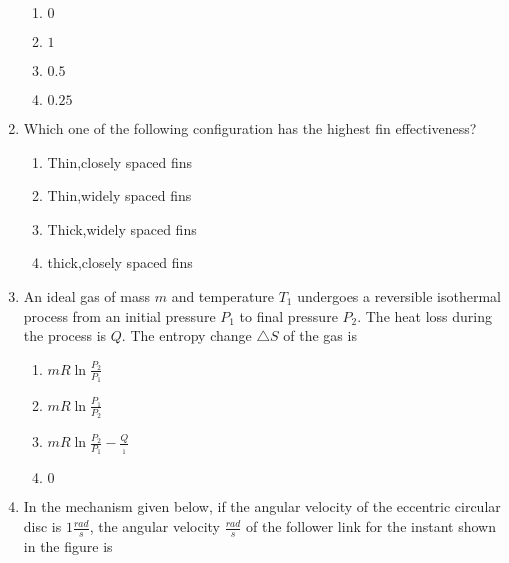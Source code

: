 \documentclass[journal]{IEEEtran}
\begin{document}
\begin{enumerate}

    \begin{enumerate}
        \item $0$
        \item $1$
        \item $0.5$
        \item $0.25$
    \end{enumerate}
    \item Which one of the following configuration has the highest fin effectiveness?
    \begin{enumerate}
        \item Thin,closely spaced fins
        \item Thin,widely spaced fins
        \item Thick,widely spaced fins
        \item thick,closely spaced fins
    \end{enumerate}
    \item An ideal gas of mass $m$ and temperature $T_1$ undergoes a reversible isothermal process from an initial pressure $P_1$ to final pressure $P_2$. The heat loss during the process is $Q$. The entropy change $\triangle S$ of the gas is
    \begin{enumerate}
        \item $mR\ln\frac{P_2}{P_1}$
        \item $mR\ln\frac{P_1}{P_2}$
        \item $mR\ln\frac{P_2}{P_1}-\frac{Q}{_1}$
        \item $0$
    \end{enumerate}
    \item In the mechanism given below, if the angular velocity of the eccentric circular disc is $1\frac{rad}{s}$, the angular velocity $\frac{rad}{s}$ of the follower link for the instant shown in the figure is
\end{enumerate}
\end{document}
